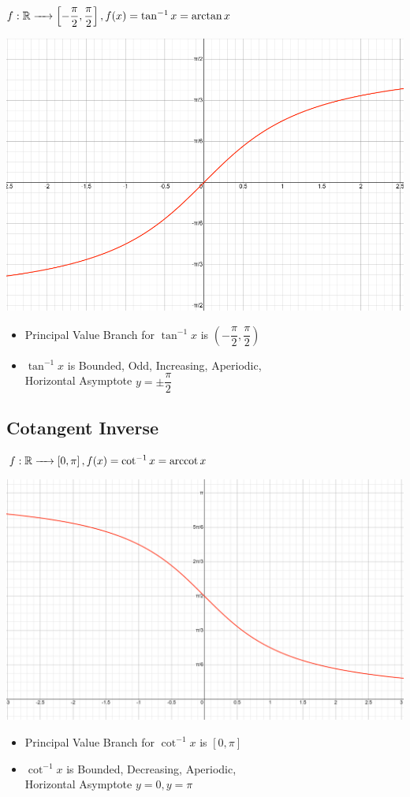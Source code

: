 \documentclass{article}
\begin{document}
$f: \mathbb{R} \xrightarrow{\hspace{4mm}} \left[-\dfrac{\pi}{2},\dfrac{\pi}{2}\right], f(x)=\tan^{-1} x = \arctan x$
\begin{center}
    \includegraphics[scale=0.6]{graph_3.png}
\end{center}
\begin{itemize}
    \item Principal Value Branch for $\tan^{-1}x$ is $\left(-\dfrac{\pi}{2},\dfrac{\pi}{2}\right)$
    \item $\tan^{-1}x$ is Bounded, Odd, Increasing, Aperiodic, 
    \\Horizontal Asymptote $y=\pm \dfrac{\pi}{2}$
\end{itemize}
\newpage
\subsection{Cotangent Inverse}
$f:\mathbb{R} \xrightarrow{\hspace{4mm}} \left[0,\pi\right], f(x)=\cot^{-1}x=\arccot x$
\begin{center}
    \includegraphics[scale=0.5]{graph_4.png}
\end{center}
\begin{itemize}
    \item Principal Value Branch for $\cot^{-1}x$ is $[0,\pi]$
    \item $\cot^{-1}x$ is Bounded, Decreasing, Aperiodic, 
    \\Horizontal Asymptote $y=0, y=\pi$
\end{itemize}
\newpage
\end{document}
